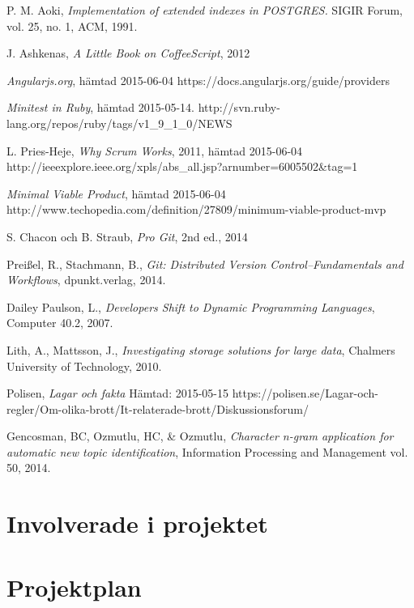 \documentclass[a4paper,12pt,oneside,final]{extbook}
\begin{document}
\begin{thebibliography}{99}
  P. M. Aoki, \emph{Implementation of extended indexes in POSTGRES.} SIGIR Forum, vol. 25, no. 1, ACM, 1991.

  J. Ashkenas, \emph{A Little Book on CoffeeScript}, 2012

    \emph{Angularjs.org}, hämtad 2015-06-04
    \newline https://docs.angularjs.org/guide/providers

  \emph{Minitest in Ruby}, hämtad 2015-05-14.
  \newline http://svn.ruby-lang.org/repos/ruby/tags/v1\_9\_1\_0/NEWS

  L. Pries-Heje, \emph{Why Scrum Works}, 2011, hämtad 2015-06-04
  \newline http://ieeexplore.ieee.org/xpls/abs\_all.jsp?arnumber=6005502&tag=1

  \emph{Minimal Viable Product}, hämtad 2015-06-04
  \newline http://www.techopedia.com/definition/27809/minimum-viable-product-mvp

  S. Chacon och B. Straub, \emph{Pro Git}, 2nd ed., 2014

  Preißel, R., Stachmann, B., \emph{Git: Distributed Version Control--Fundamentals and Workflows}, dpunkt.verlag, 2014.

  Dailey Paulson, L., \emph{Developers Shift to Dynamic Programming Languages}, Computer 40.2, 2007.

  Lith, A., Mattsson, J., \emph{Investigating storage solutions for large data}, Chalmers University of Technology, 2010.

  Polisen, \emph{Lagar och fakta} Hämtad: 2015-05-15
  \newline https://polisen.se/Lagar-och-regler/Om-olika-brott/It-relaterade-brott/Diskussionsforum/

  Gencosman, BC, Ozmutlu, HC, \& Ozmutlu, \emph{Character n-gram application for automatic new topic identification},
  Information Processing and Management vol. 50, 2014.

\end{thebibliography}


\appendix

\chapter{Involverade i projektet}
\chapter{Projektplan}

\end{document}
